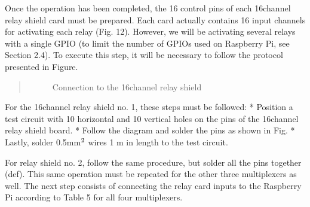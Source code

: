 \documentclass[letterpaper,10pt,english]{sphinxmanual}
\let\sphinxpxdimen\pdfpxdimen\else\newdimen\sphinxpxdimen
\begin{document}
\sphinxAtStartPar
Once the operation has been completed, the 16 control pins of each 16\sphinxhyphen{}channel relay shield card must be prepared. Each card actually contains 16 input channels
for activating each relay (Fig. 12). However, we will be activating several relays with a single GPIO (to limit the number of GPIOs used on Raspberry Pi,
see Section 2.4). To execute this step, it will be necessary to follow the protocol presented in Figure.
\begin{quote}

\begin{figure}[htbp]
\centering
\capstart

\noindent\sphinxincludegraphics[width=800\sphinxpxdimen,height=400\sphinxpxdimen]{{connection}.jpg}
\caption{Connection to the 16\sphinxhyphen{}channel relay shield}\label{\detokenize{V1_02:id7}}\end{figure}
\end{quote}

\sphinxAtStartPar
For the 16\sphinxhyphen{}channel relay shield no. 1, these steps must be followed:
*       Position a test circuit with 10 horizontal and 10 vertical holes on the pins of the 16\sphinxhyphen{}channel relay shield board.
*       Follow the diagram and solder the pins as shown in Fig.
*       Lastly, solder 0.5\sphinxhyphen{}mm\(\sp{\text{2}}\) wires 1 m in length to the test circuit.

\sphinxAtStartPar
For relay shield no. 2, follow the same procedure, but solder all the pins together (d\sphinxhyphen{}e\sphinxhyphen{}f).
This same operation must be repeated for the other three multiplexers as well.
The next step consists of connecting the relay card inputs to the Raspberry Pi according to Table 5 for all four multiplexers.
\end{document}
